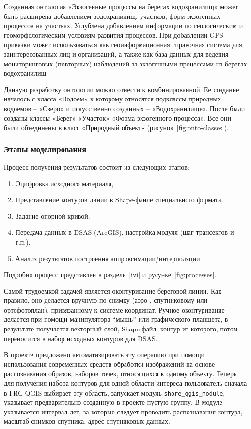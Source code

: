 \documentclass[732,14pt,final]{studrep}
\begin{document}
Созданная онтология «Экзогенные процессы на берегах водохранилищ» может быть расширена добавлением водохранилищ, участков, форм экзогенных процессов на участках. Углублена добавлением информации по геологическим и геоморфологическим условиям развития процессов. При добавлении GPS-привязки может использоваться как геоинформационная справочная система для заинтересованных лиц и организаций, а также как база данных для ведения мониторинговых (повторных) наблюдений за экзогенными процессами на берегах водохранилищ.

Данную разработку онтологии можно отнести к комбинированной. Ее создание началось с класса «Водоем» к которому относятся подклассы природных водоемов – «Озеро» и искусственно созданных – «Водохранилище». После были созданы классы «Берег» «Участок» «Форма экзогенного процесса». Все они были объединены в класс «Природный объект» (рисунок~\ref{fig:onto-classes}).

\subsubsection{Этапы моделирования}
\label{sec:model-stages}

Процесс получения результатов состоит из следующих этапов:
\begin{enumerate}
\item Оцифровка исходного материала,
\item Представление контуров линий в Shape-файле специального формата,
\item   Задание опорной кривой.
\item   Передача данных в DSAS (ArcGIS), настройка модуля (шаг трансектов и т.п.).
\item   Анализ результатов построения аппроксимации/интерполяции.
\end{enumerate}

Подробно процесс представлен в разделе~\ref{ivi} и русунке~\ref{fig:processes}.

Самой трудоемкой задачей является оконтуривание береговой линии. Как правило, оно делается вручную по снимку (аэро-, спутниковому или ортофотоплан), привязанному к системе координат. Ручное оконтуривание делается при помощи манипулятора “мышь” или графического планшета, в результате получается векторный слой, Shape-файл, контур из которого, потом переносится в набор исходных контуров для DSAS.

В проекте предложено автоматизировать эту операцию при помощи использования современных средств обработки изображений на основе распознавания образов, наборов точек, относящихся к одному объекту. Теперь для получения набора контуров для одной области интереса пользователь сначала в ГИС QGIS выбирает эту область, запускает модуль \verb|shore_qgis_module|, указывает предварительно созданную в проекте пустую группу. В модуле указывается интервал лет, за которые следует проводить распознавания контура, масштаб снимков спутника, адрес спутниковых данных.
\end{document}
